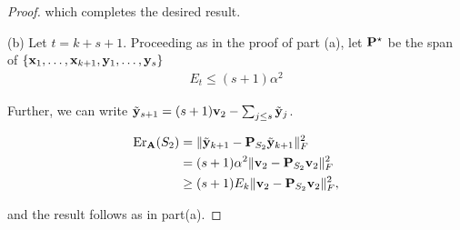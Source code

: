 \documentclass{article}
\begin{document}
\begin{proof}
which completes the desired result.


  

 (b) Let $ t = k+s+1$. Proceeding as in the proof of part (a), let $\P^\star$ be the span of $\{\x_1,\ldots,\x_{k+1}, \y_1, \ldots,\y_s\}$
 \begin{align*}
 E_t \leq (s+1)\alpha^2
 \end{align*}

 Further, we can write $\tilde\y_{s+1} = (s + 1)\v_2 -\sum_{j\leq s } \tilde \y_j$.

 	\begin{align*}
 \Er_{\A}(S_2) &= \| \tilde\y_{k+1}- \P_{S_2} \tilde\y_{k+1}  \|_F^2 \\
 & = (s+1)\alpha^2\| \v_2 - \P_{S_2} \v_2  \|_F^2 \\
 & \geq (s + 1) E_k\| \v_2 - \P_{S_2} \v_2  \|_F^2,
 \end{align*}

 and the result follows as in part(a).

\end{proof}
\end{document}
